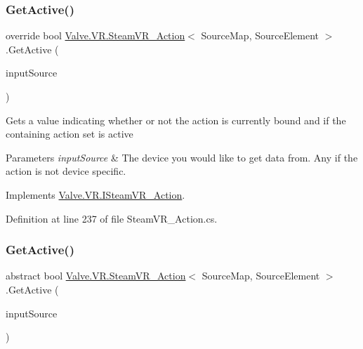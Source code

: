 \subsubsection{\texorpdfstring{GetActive()}{GetActive()}\hspace{0.1cm}{\footnotesize\ttfamily [1/2]}}
{\footnotesize\ttfamily override bool \mbox{\hyperlink{class_valve_1_1_v_r_1_1_steam_v_r___action}{Valve.\+V\+R.\+Steam\+V\+R\+\_\+\+Action}}$<$ Source\+Map, Source\+Element $>$.Get\+Active (\begin{DoxyParamCaption}\item[{\mbox{\hyperlink{namespace_valve_1_1_v_r_a82e5bf501cc3aa155444ee3f0662853f}{Steam\+V\+R\+\_\+\+Input\+\_\+\+Sources}}}]{input\+Source }\end{DoxyParamCaption})}



Gets a value indicating whether or not the action is currently bound and if the containing action set is active 


\begin{DoxyParams}{Parameters}
{\em input\+Source} & The device you would like to get data from. Any if the action is not device specific.\\
\hline
\end{DoxyParams}


Implements \mbox{\hyperlink{interface_valve_1_1_v_r_1_1_i_steam_v_r___action_ad8d90df47697c9e5b43a0a46a241aa85}{Valve.\+V\+R.\+I\+Steam\+V\+R\+\_\+\+Action}}.



Definition at line 237 of file Steam\+V\+R\+\_\+\+Action.\+cs.

\mbox{\label{class_valve_1_1_v_r_1_1_steam_v_r___action_a22690e2467a2d5b78b495f7fcdd5666b}} 
\subsubsection{\texorpdfstring{GetActive()}{GetActive()}\hspace{0.1cm}{\footnotesize\ttfamily [2/2]}}
{\footnotesize\ttfamily abstract bool \mbox{\hyperlink{class_valve_1_1_v_r_1_1_steam_v_r___action}{Valve.\+V\+R.\+Steam\+V\+R\+\_\+\+Action}}$<$ Source\+Map, Source\+Element $>$.Get\+Active (\begin{DoxyParamCaption}\item[{\mbox{\hyperlink{namespace_valve_1_1_v_r_a82e5bf501cc3aa155444ee3f0662853f}{Steam\+V\+R\+\_\+\+Input\+\_\+\+Sources}}}]{input\+Source }\end{DoxyParamCaption})\hspace{0.3cm}{\ttfamily [pure virtual]}}




